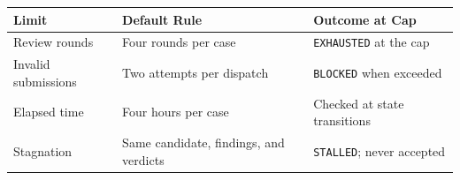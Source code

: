 \begin{tabular}{@{}P{3.0cm}P{4.6cm}P{4.9cm}@{}}
\toprule
\textbf{Limit} & \textbf{Default Rule} & \textbf{Outcome at Cap} \\
\midrule
Review rounds & Four rounds per case & \texttt{EXHAUSTED} at the cap \\
Invalid submissions & Two attempts per dispatch & \texttt{BLOCKED} when exceeded \\
Elapsed time & Four hours per case & Checked at state transitions \\
Stagnation & Same candidate, findings, and verdicts & \texttt{STALLED}; never accepted \\
\bottomrule
\end{tabular}
